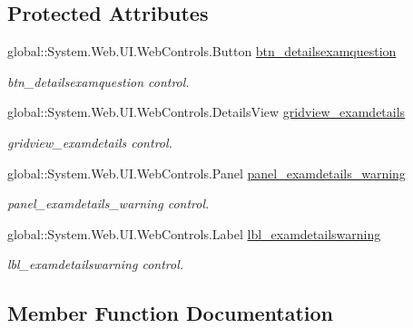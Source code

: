 \subsection*{Protected Attributes}
\begin{DoxyCompactItemize}
\item 
global\+::\+System.\+Web.\+U\+I.\+Web\+Controls.\+Button \mbox{\hyperlink{class_admin__details_exam_question_af9a5cb8f1cdee523bd430f30ff8971af}{btn\+\_\+detailsexamquestion}}
\begin{DoxyCompactList}\small\item\em btn\+\_\+detailsexamquestion control. \end{DoxyCompactList}\item 
global\+::\+System.\+Web.\+U\+I.\+Web\+Controls.\+Details\+View \mbox{\hyperlink{class_admin__details_exam_question_a043f21112f8b792f69d4ac754c621366}{gridview\+\_\+examdetails}}
\begin{DoxyCompactList}\small\item\em gridview\+\_\+examdetails control. \end{DoxyCompactList}\item 
global\+::\+System.\+Web.\+U\+I.\+Web\+Controls.\+Panel \mbox{\hyperlink{class_admin__details_exam_question_a54f364fba301ac92ceabf45a32e4e065}{panel\+\_\+examdetails\+\_\+warning}}
\begin{DoxyCompactList}\small\item\em panel\+\_\+examdetails\+\_\+warning control. \end{DoxyCompactList}\item 
global\+::\+System.\+Web.\+U\+I.\+Web\+Controls.\+Label \mbox{\hyperlink{class_admin__details_exam_question_ababe7d036acbce604df387e9a254ccc0}{lbl\+\_\+examdetailswarning}}
\begin{DoxyCompactList}\small\item\em lbl\+\_\+examdetailswarning control. \end{DoxyCompactList}\end{DoxyCompactItemize}


\subsection{Member Function Documentation}
\mbox{\label{class_admin__details_exam_question_a8c8c5afd057b8cc83c1dbc4d259ae2ed}} 
